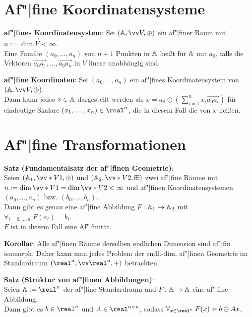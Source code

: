 \pagebreak

\section{%
    Af"|fine Koordinatensysteme%
}

\textbf{af"|fines Koordinatensystem}:
Sei $(\AA, \vec{V}, \oplus)$ ein af"|finer Raum mit $n := \dim \vec{V} < \infty$.\\
Eine Familie $(a_0, \dotsc, a_n)$ von $n+1$ Punkten in $\AA$ heißt
 für $\AA$ mit  $a_0$, falls die
Vektoren $\vec{a_0a_1}, \dotsc, \vec{a_0a_n}$ in $V$ linear unabhängig sind.

\textbf{af"|fine Koordinaten}:
Sei $(a_0, \dotsc, a_n)$ ein af"|fines Koordinatensystem von $(\AA, \vec{V}, \oplus)$.\\
Dann kann jedes $x \in \AA$ dargestellt werden als
$x = a_0 \oplus (\sum_{i=1}^n x_i \vec{a_0a_i})$
für eindeutige Skalare $(x_1, \dotsc, x_n) \in \real^n$, die in diesem Fall die
 von $x$ heißen.

\section{%
    Af"|fine Transformationen%
}

\textbf{Satz (Fundamentalsatz der af"|finen Geometrie)}:\\
Seien $(\AA_1, \vecs{V}{1}, \oplus)$ und $(\AA_2, \vecs{V}{2}, \boxplus)$ zwei af"|fine Räume
mit $n := \dim \vecs{V}{1} = \dim \vecs{V}{2} < \infty$
und af"|finen Koordinatensystemen $(a_0, \dotsc, a_n)$ bzw. $(b_0, \dotsc, b_n)$.\\
Dann gibt es genau eine af"|fine Abbildung $F\colon \AA_1 \to \AA_2$ mit
$\forall_{i=0,\dotsc,n}\; F(a_i) = b_i$.\\
$F$ ist in diesem Fall eine Af"|finität.

\textbf{Korollar}:
Alle af"|finen Räume derselben endlichen Dimension sind af"|fin isomorph.
Daher kann man jedes Problem der endl.-dim. af"|finen Geometrie im Standardraum
$(\real^n, \vec{\real}^n, +)$ betrachten.

\linie

\textbf{Satz (Struktur von af"|finen Abbildungen)}:\\
Seien $\AA := \real^n$ der af"|fine Standardraum und
$F\colon \AA \to \AA$ eine af"|fine Abbildung.\\
Dann gibt es $b \in \real^n$ und $A \in \real^{n \times n}$, sodass
$\forall_{x \in \real^n}\; F(x) = b \oplus Ax$.

